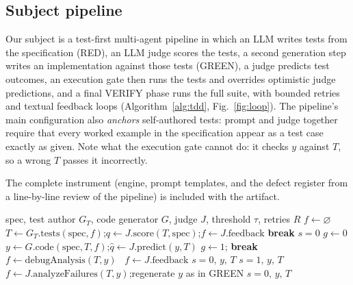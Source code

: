 \documentclass{article}
\begin{document}
\subsection{Subject pipeline}

Our subject is a test-first multi-agent pipeline in which an LLM writes tests from the
specification (RED), an LLM judge scores the tests, a second generation step writes an
implementation against those tests (GREEN), a judge predicts test outcomes, an execution
gate then runs the tests and overrides optimistic judge predictions, and a final VERIFY phase
runs the full suite, with bounded retries and textual feedback loops
(Algorithm~\ref{alg:tdd}, Fig.~\ref{fig:loop}). The pipeline's main configuration also
\emph{anchors} self-authored tests: prompt and judge together require that every worked example
in the specification appear as a test case exactly as given. Note what the execution gate cannot do:
it checks $y$ against $T$, so a wrong $T$ passes it incorrectly.

The complete instrument (engine, prompt templates, and the defect register from a
line-by-line review of the pipeline) is included with the artifact.

\begin{algorithm}[t]
\caption{Execution-gated TDD cycle (subject pipeline; generator $G$ and judge $J$ are
role-assigned per experimental cell)}
\label{alg:tdd}
\begin{algorithmic}[1]
\Require spec, test author $G_T$, code generator $G$, judge $J$, threshold $\tau$, retries $R$
\State $f \gets \varnothing$
 
  \State $T \gets G_T.\mathrm{tests}(\mathrm{spec}, f)$;\quad $q \gets J.\mathrm{score}(T, \mathrm{spec})$;\quad $f \gets J.\mathrm{feedback}$
   \textbf{break} \EndIf
\EndFor
{} \Return $s{=}0$ \EndIf
\State $g \gets 0$
 
  \State $y \gets G.\mathrm{code}(\mathrm{spec}, T, f)$;\quad $\hat{q} \gets J.\mathrm{predict}(y, T)$
     $g \gets 1$; \textbf{break} 
    \Else\ $f \gets \mathrm{debugAnalysis}(T, y)$ \EndIf
  \Else\ $f \gets J.\mathrm{feedback}$ \EndIf
\EndFor
{} \Return $s{=}0,\,y,\,T$ \EndIf
{} 
   \Return $s{=}1,\, y,\, T$ \EndIf
  \State $f \gets J.\mathrm{analyzeFailures}(T, y)$;\quad regenerate $y$ as in GREEN
\EndFor
\State \Return $s{=}0,\, y,\, T$
\end{algorithmic}
\end{algorithm}
\end{document}
